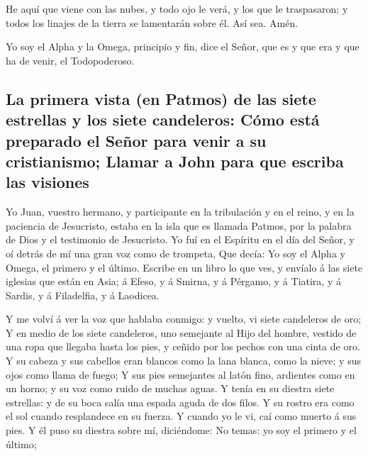  He aquí que viene con las nubes, y todo ojo le verá, y los
que le traspasaron; y todos los linajes de la tierra se lamentarán sobre
él. Así sea. Amén.

 Yo soy el Alpha y la Omega, principio y fin, dice el Señor,
que es y que era y que ha de venir, el Todopoderoso.

\hypertarget{la-primera-vista-en-patmos-de-las-siete-estrellas-y-los-siete-candeleros-cuxf3mo-estuxe1-preparado-el-seuxf1or-para-venir-a-su-cristianismo-llamar-a-john-para-que-escriba-las-visiones}{%
\subsection{La primera vista (en Patmos) de las siete estrellas y los
siete candeleros: Cómo está preparado el Señor para venir a su
cristianismo; Llamar a John para que escriba las
visiones}\label{la-primera-vista-en-patmos-de-las-siete-estrellas-y-los-siete-candeleros-cuxf3mo-estuxe1-preparado-el-seuxf1or-para-venir-a-su-cristianismo-llamar-a-john-para-que-escriba-las-visiones}}

 Yo Juan, vuestro hermano, y participante en la tribulación
y en el reino, y en la paciencia de Jesucristo, estaba en la isla que es
llamada Patmos, por la palabra de Dios y el testimonio de Jesucristo.
 Yo fuí en el Espíritu en el día del Señor, y oí detrás de
mí una gran voz como de trompeta,  Que decía: Yo soy el
Alpha y Omega, el primero y el último. Escribe en un libro lo que ves, y
envíalo á las siete iglesias que están en Asia; á Efeso, y á Smirna, y á
Pérgamo, y á Tiatira, y á Sardis, y á Filadelfia, y á Laodicea.

 Y me volví á ver la voz que hablaba conmigo: y vuelto, vi
siete candeleros de oro;  Y en medio de los siete
candeleros, uno semejante al Hijo del hombre, vestido de una ropa que
llegaba hasta los pies, y ceñido por los pechos con una cinta de oro.
 Y su cabeza y sus cabellos eran blancos como la lana
blanca, como la nieve; y sus ojos como llama de fuego;  Y
sus pies semejantes al latón fino, ardientes como en un horno; y su voz
como ruido de muchas aguas.  Y tenía en su diestra siete
estrellas: y de su boca salía una espada aguda de dos filos. Y su rostro
era como el sol cuando resplandece en su fuerza.  Y cuando
yo le vi, caí como muerto á sus pies. Y él puso su diestra sobre mí,
diciéndome: No temas: yo soy el primero y el último;

